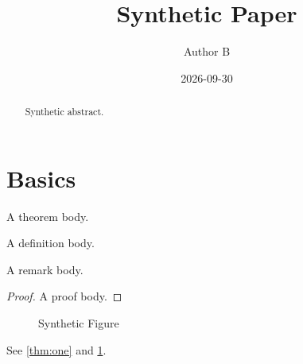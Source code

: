 \documentclass{elegantpaper}
\title{Synthetic Paper}
\author{Author B}
\institute{Synthetic Institute}
\date{2026-09-30}
\begin{document}
\maketitle
\begin{abstract}Synthetic abstract.\end{abstract}
\tableofcontents
\section{Basics}\label{sec:intro}
\begin{theorem}[Finite]\label{thm:one}
A theorem body.
\end{theorem}
\begin{definition}[Set]\label{def:one}
A definition body.
\end{definition}
\begin{remark}
A remark body.
\end{remark}
\begin{proof}
A proof body.
\end{proof}
\begin{figure}\centering\caption{Synthetic Figure}\label{fig:one}\end{figure}
See \ref{thm:one} and \ref{fig:one}.
\end{document}
